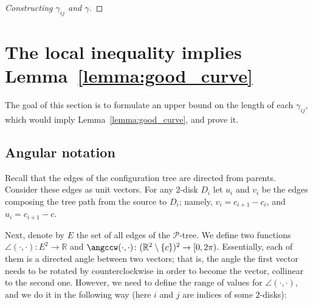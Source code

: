 \begin{proof}[Constructing $\gamma_{ij}$ and $\gamma$]
\end{proof}


\section{The local inequality implies Lemma~\ref{lemma:good_curve}}

The goal of this section is to formulate an upper bound on the length of each $\gamma_{ij}$, which would imply Lemma~\ref{lemma:good_curve}, and prove it.

\subsection{Angular notation}

Recall that the edges of the configuration tree are directed from parents. Consider these edges as unit vectors.
For any $2$-disk $D_i$ let $u_i$ and $v_i$ be the edges composing the tree path from the source to $D_i$; namely, $v_i = c_{i+1} - c_i$, and $u_i = c_{i+1} - c$.

Next, denote by $E$ the set of all edges of the $\mathcal{P}$-tree. We define two functions $\angle(\cdot, \cdot)\colon E^2\to\mathbb{R}$ and $\angccw(\cdot, \cdot)\colon (\mathbb{R}^2\setminus\{c\})^2\to[0, 2\pi)$. Essentially, each of them is a directed angle between two vectors; that is, the angle the first vector needs to be rotated by counterclockwise in order to become the vector, collinear to the second one. However, we need to define the range of values for $\angle(\cdot, \cdot)$, and we do it in the following way (here $i$ and $j$ are indices of some $2$-disks):

